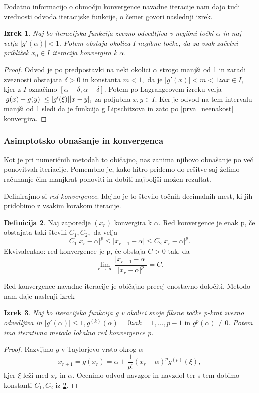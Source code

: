 \documentclass[12pt,a4paper]{amsart}
\theoremstyle{definition} %
\newtheorem{definicija}{Definicija}[section]
\theoremstyle{plain} %
\newtheorem{izrek}[definicija]{Izrek}
\begin{document}
Dodatno informacijo o območju konvergence navadne iteracije nam dajo tudi vrednosti odvoda iteracijske funkcije, o čemer govori naslednji izrek.
\begin{izrek}
    Naj bo iteracijska funkcija zvezno odvedljiva v negibni točki $\alpha$ in naj velja $\lvert g'(\alpha) \rvert < 1.$ Potem obstaja okolica I negibne točke,
    da za vsak začetni približek $x_{0} \in I$ iteracija konvergira k $\alpha.$
\end{izrek}
\begin{proof}
    Odvod je po predpostavki na neki okolici $\alpha$ strogo manjši od 1 in zaradi zveznosti obstajata $\delta > 0$ in konstanta $m < 1,$ da je $\lvert g'(x) \rvert < m < 1 za x \in I,$
    kjer z $I$ označimo $[\alpha - \delta,\alpha + \delta ].$ Potem po Lagrangeovem izreku velja $\lvert g(x) - g(y) \rvert \leq \lvert g'(\xi) \rvert \dot \lvert x - y \rvert,$
    za poljubna $x,y \in I.$ Ker je odvod na tem intervalu manjši od 1 sledi da je funkcija g Lipschitzova in zato po \eqref{prva_neenakost} konvergira.
\end{proof}

\subsubsection{Asimptotsko obnašanje in konvergenca}
Kot je pri numeričnih metodah to običajno, nas zanima njihovo obnašanje po več ponovitvah iteriacije. Pomembno je, kako hitro pridemo do rešitve saj želimo računanje čim manjkrat
ponoviti in dobiti najboljši možen rezultat.

Definirajmo si \textit{red konvergence}. Idejno je to število točnih decimalnih mest, ki jih pridobimo z vsakim korakom iteracije. 
\begin{definicija}\label{red_konv}
    Naj zaporedje $(x_{r})$ konvergira k $\alpha.$ Red konvergence je enak p, če obstajata taki števili $C_{1}, C_{2},$ da velja
    \[
        C_{1}\lvert x_{r} - \alpha \rvert ^{p} \leq \lvert x_{r+1} - \alpha \rvert \leq C_{2} \lvert x_{r} - \alpha \rvert^{p}.
    \]
    Ekvivalentno: red konvergence je p, če obstaja $C > 0$ tak, da
    \[
        \lim_{r\to\infty} \frac{\lvert x_{r+1} - \alpha\rvert}{\lvert x_{r} - \alpha\rvert^{p}} = C.
    \]
\end{definicija}

Red konvergence navadne iteracije je običajno precej enostavno določiti. Metodo nam daje naslenji izrek
\begin{izrek}
    Naj bo iteracijska funkcija g v okolici svoje fiksne točke p-krat zvezno odvedljiva in $\lvert g'(\alpha) \rvert \leq 1, g^{(k)}(\alpha) = 0 za k = 1,\ldots,p-1 \text{ in }
    g^{p}(\alpha) \neq 0.$ Potem ima iterativna metoda lokalno red konvergence p.
\end{izrek}
\begin{proof}
    Razvijmo $g$ v Taylorjevo vrsto okrog $\alpha$
    \[
        x_{r+1} = g(x_{r}) = \alpha + \frac{1}{p!}(x_{r} - \alpha)^{p}g^{(p)}(\xi),
    \]
    kjer $\xi$ leži med $x_{r}$ in $\alpha.$ Ocenimo odvod navzgor in navzdol ter s tem dobimo konstanti $C_{1},C_{2}$ iz \ref{red_konv}.
\end{proof}
\end{document}
